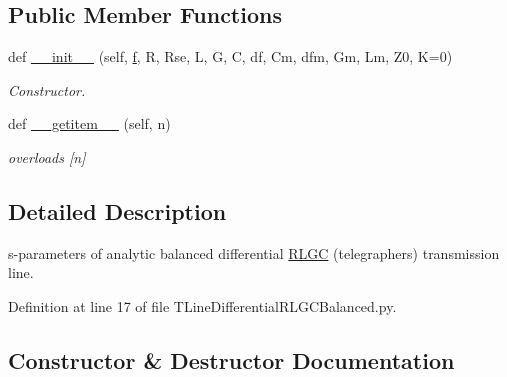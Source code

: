 \subsection*{Public Member Functions}
\begin{DoxyCompactItemize}
\item 
def \hyperlink{classSignalIntegrity_1_1SParameters_1_1Devices_1_1TLineDifferentialRLGCBalanced_1_1TLineDifferentialRLGCBalanced_a487b1dcd331b164ab28d7a15e7da47d0}{\+\_\+\+\_\+init\+\_\+\+\_\+} (self, \hyperlink{classSignalIntegrity_1_1SParameters_1_1SParameters_1_1SParameters_a32e7a34d6837fe949b413c852a0447f8}{f}, R, Rse, L, G, C, df, Cm, dfm, Gm, Lm, Z0, K=0)
\begin{DoxyCompactList}\small\item\em Constructor. \end{DoxyCompactList}\item 
def \hyperlink{classSignalIntegrity_1_1SParameters_1_1Devices_1_1TLineDifferentialRLGCBalanced_1_1TLineDifferentialRLGCBalanced_ab7a6da5139e0878b590d68292aaa70f2}{\+\_\+\+\_\+getitem\+\_\+\+\_\+} (self, n)
\begin{DoxyCompactList}\small\item\em overloads \mbox{[}n\mbox{]} \end{DoxyCompactList}\end{DoxyCompactItemize}


\subsection{Detailed Description}
s-\/parameters of analytic balanced differential \hyperlink{namespaceSignalIntegrity_1_1SParameters_1_1RLGC}{R\+L\+GC} (telegrapher\textquotesingle{}s) transmission line. 



Definition at line 17 of file T\+Line\+Differential\+R\+L\+G\+C\+Balanced.\+py.



\subsection{Constructor \& Destructor Documentation}
\mbox{\label{classSignalIntegrity_1_1SParameters_1_1Devices_1_1TLineDifferentialRLGCBalanced_1_1TLineDifferentialRLGCBalanced_a487b1dcd331b164ab28d7a15e7da47d0}} 
